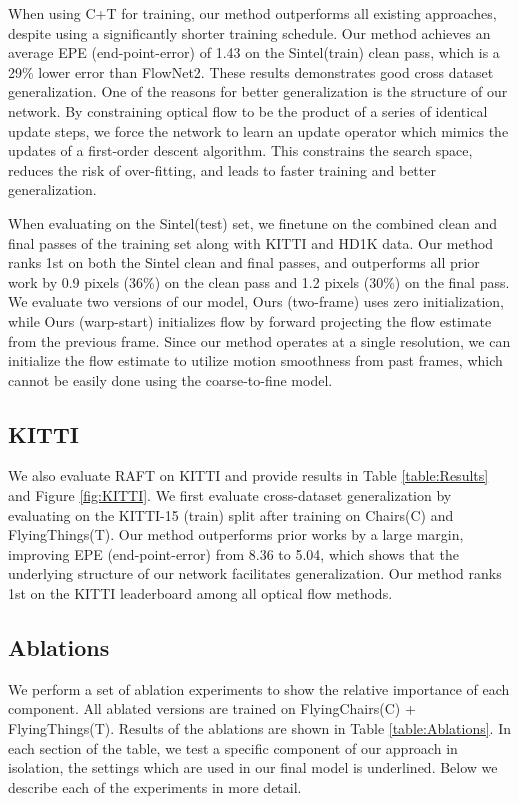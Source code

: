 \documentclass[runningheads]{llncs}
\begin{document}
When using C+T for training, our method outperforms all existing approaches, despite using a significantly shorter training schedule. Our method achieves an average EPE (end-point-error) of 1.43 on the Sintel(train) clean pass, which is a 29\% lower error than FlowNet2. These results demonstrates good cross dataset generalization. One of the reasons for better generalization is the structure of our network. By constraining optical flow to be the product of a series of identical update steps, we force the network to learn an update operator which mimics the updates of a first-order descent algorithm. This constrains the search space, reduces the risk of over-fitting, and leads to faster training and better generalization.

When evaluating on the Sintel(test) set, we finetune on the combined clean and final passes of the training set along with KITTI and HD1K data. Our method ranks 1st on both the Sintel clean and final passes, and outperforms all prior work by 0.9 pixels (36\%) on the clean pass and 1.2 pixels (30\%) on the final pass. We evaluate two versions of our model, Ours (two-frame) uses zero initialization, while Ours (warp-start) initializes flow by forward projecting the flow estimate from the previous frame. Since our method operates at a single resolution, we can initialize the flow estimate to utilize motion smoothness from past frames, which cannot be easily done using the coarse-to-fine model.


\subsection{KITTI}
We also evaluate RAFT on KITTI and provide results in Table \ref{table:Results} and Figure \ref{fig:KITTI}. We first evaluate cross-dataset generalization by evaluating on the KITTI-15 (train) split after training on Chairs(C) and FlyingThings(T). Our method outperforms prior works by a large margin, improving EPE (end-point-error) from 8.36 to 5.04, which shows that the underlying structure of our network facilitates generalization. Our method ranks 1st on the KITTI leaderboard among all optical flow methods.



\subsection{Ablations}
\label{sec:ablations}
We perform a set of ablation experiments to show the relative importance of each component. All ablated versions are trained on FlyingChairs(C) + FlyingThings(T). Results of the ablations are shown in Table \ref{table:Ablations}. In each section of the table, we test a specific component of our approach in isolation, the settings which are used in our final model is underlined. Below we describe each of the experiments in more detail.
\end{document}
